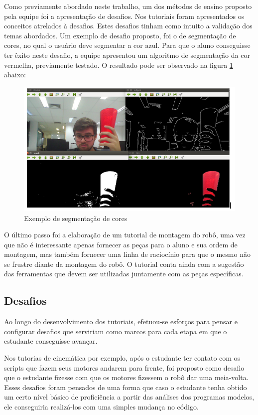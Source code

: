 Como previamente abordado neste trabalho, um dos métodos de ensino proposto pela equipe foi a apresentação de desafios. Nos tutoriais foram apresentados os conceitos atrelados à desafios. Estes desafios tinham como intuito a validação dos temas abordados. Um exemplo de desafio proposto, foi o de segmentação de cores, no qual o usuário deve segmentar a cor azul. Para que o aluno conseguisse ter êxito neste desafio, a equipe apresentou  um algoritmo de segmentação da cor vermelha, previamente testado. O resultado pode ser observado na figura \ref{fig:vermelho} abaixo:

\begin{figure}[H]
	\centering
	\includegraphics[scale=0.75, angle=0]{Figures/vermelho.png}
	\caption{Exemplo de segmentação de cores}
	\label{fig:vermelho}
\end{figure}

O último passo foi a elaboração de um tutorial de montagem do robô, uma vez que não é interessante apenas fornecer as peças para o aluno e sua ordem de montagem, mas também fornecer uma linha de raciocínio para que o mesmo não se frustre diante da montagem do robô. O tutorial conta ainda com a sugestão das ferramentas que devem ser utilizadas juntamente com as peças específicas.

\subsection{Desafios}
Ao longo do desenvolvimento dos tutoriais, efetuou-se esforços para pensar e configurar desafios que serviriam como marcos para cada etapa em que o estudante conseguisse avançar. 

Nos tutorias de cinemática por exemplo, após o estudante ter contato com os scripts que fazem seus motores andarem para frente, foi proposto como desafio que o estudante fizesse com que os motores fizessem o robô dar uma meia-volta. Esses desafios foram pensados de uma forma que caso o estudante tenha obtido um certo nível básico de proficiência a partir das análises dos programas modelos, ele conseguiria realizá-los com uma simples mudança no código.

